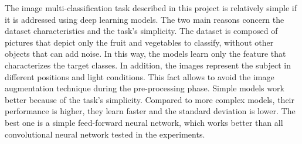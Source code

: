 The image multi-classification task described in this project is
relatively simple if it is addressed using deep learning models. The two
main reasons concern the dataset characteristics and the task's
simplicity. The dataset is composed of pictures that depict only the
fruit and vegetables to classify, without other objects that can add
noise. In this way, the models learn only the feature that characterizes
the target classes. In addition, the images represent the subject in
different positions and light conditions. This fact allows to avoid the
image augmentation technique during the pre-processing phase. Simple
models work better because of the task's simplicity. Compared to more
complex models, their performance is higher, they learn faster and the
standard deviation is lower. The best one is a simple feed-forward
neural network, which works better than all convolutional neural network
tested in the experiments.



